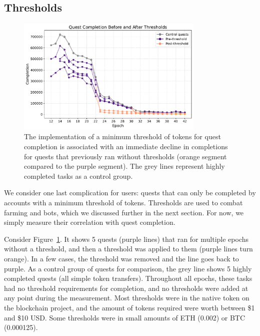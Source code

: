 
\subsection{Thresholds}
\label{sec:thresh}

\begin{figure}[t]
    \centering
    \includegraphics[width=0.8\textwidth]{figures/threshold.pdf}
    \caption{The implementation of a minimum threshold of tokens for quest completion is associated with an immediate decline in completions for quests that previously ran without thresholds (orange segment compared to the purple segment). The grey lines represent highly completed tasks as a control group.\label{fig:threshold}}
\end{figure}

We consider one last complication for users: quests that can only be completed by accounts with a minimum threshold of tokens. Thresholds are used to combat farming and bots, which we discussed further in the next section. For now, we simply measure their correlation with quest completion. 

Consider Figure~\ref{fig:threshold}. It shows 5 quests (purple lines) that ran for multiple epochs without a threshold, and then a threshold was applied to them (purple lines turn orange). In a few cases, the threshold was removed and the line goes back to purple. As a control group of quests for comparison, the grey line shows 5 highly completed quests (all simple token transfers). Throughout all epochs, these tasks had no threshold requirements for completion, and no thresholds were added at any point during the measurement. Most thresholds were in the native token on the blockchain project, and the amount of tokens required were worth between \$1 and \$10 USD. Some thresholds were in small amounts of ETH (0.002) or BTC (0.000125). 

